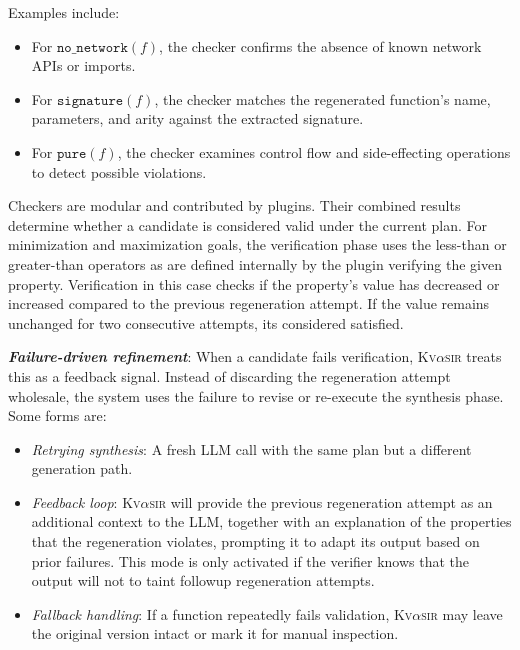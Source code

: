 \documentclass[nonacm,sigplan,review]{acmart}
\newcommand{\sys}{{\scshape Kv{$\alpha$}sir}\xspace}
\newcommand{\heading}[1]{\vspace{2pt}\noindent\textbf{\emph{#1}}:\enspace}
\begin{document}
Examples include:
\begin{itemize}
  \item For $\texttt{no\_network}(f)$, the checker confirms the absence of known network APIs or imports.
  \item For $\texttt{signature}(f)$, the checker matches the regenerated function's name, parameters, and arity against the extracted signature.
  \item For $\texttt{pure}(f)$, the checker examines control flow and side-effecting operations to detect possible violations.
\end{itemize}

Checkers are modular and contributed by plugins. Their combined results determine whether a candidate is considered valid under the current plan.
For minimization and maximization goals, the verification phase uses the less-than or greater-than operators as are defined internally by the plugin verifying the given property.
Verification in this case checks if the property's value has decreased or increased compared 
to the previous regeneration attempt.
If the value remains unchanged for two consecutive attempts, its considered satisfied.

\heading{Failure-driven refinement}
When a candidate fails verification, \sys treats this as a feedback signal. Instead of discarding the regeneration attempt wholesale, the system uses the failure to revise or re-execute the synthesis phase.
Some forms are:
\begin{itemize}
  \item \emph{Retrying synthesis}: A fresh LLM call with the same plan but a different generation path.
  \item \emph{Feedback loop}: \sys will provide the previous regeneration attempt 
    as an additional context to the LLM, together with an explanation of the properties that the regeneration violates, prompting it to adapt its output based on prior failures.
    This mode is only activated if the verifier knows that the output will not to taint
    followup regeneration attempts.
  \item \emph{Fallback handling}: If a function repeatedly fails validation, \sys may leave the original version intact or mark it for manual inspection.
\end{itemize}

\end{document}
